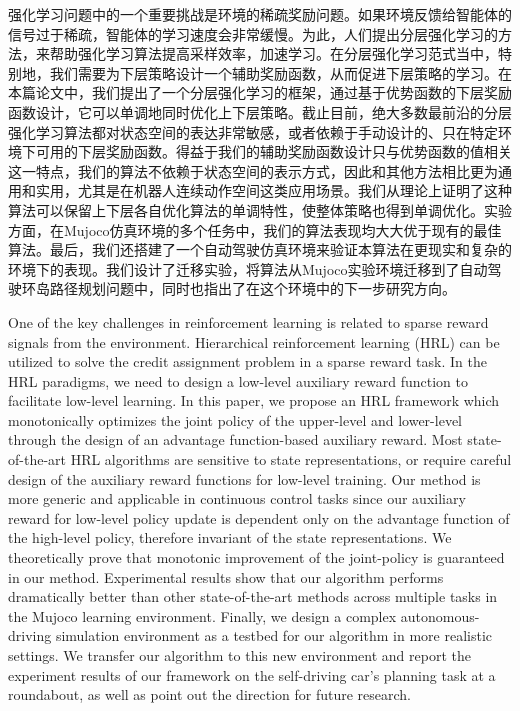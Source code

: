 \begin{cabstract}
强化学习问题中的一个重要挑战是环境的稀疏奖励问题。如果环境反馈给智能体的信号过于稀疏，智能体的学习速度会非常缓慢。为此，人们提出分层强化学习的方法，来帮助强化学习算法提高采样效率，加速学习。在分层强化学习范式当中，特别地，我们需要为下层策略设计一个辅助奖励函数，从而促进下层策略的学习。在本篇论文中，我们提出了一个分层强化学习的框架，通过基于优势函数的下层奖励函数设计，它可以单调地同时优化上下层策略。截止目前，绝大多数最前沿的分层强化学习算法都对状态空间的表达非常敏感，或者依赖于手动设计的、只在特定环境下可用的下层奖励函数。得益于我们的辅助奖励函数设计只与优势函数的值相关这一特点，我们的算法不依赖于状态空间的表示方式，因此和其他方法相比更为通用和实用，尤其是在机器人连续动作空间这类应用场景。我们从理论上证明了这种算法可以保留上下层各自优化算法的单调特性，使整体策略也得到单调优化。实验方面，在Mujoco仿真环境的多个任务中，我们的算法表现均大大优于现有的最佳算法。最后，我们还搭建了一个自动驾驶仿真环境来验证本算法在更现实和复杂的环境下的表现。我们设计了迁移实验，将算法从Mujoco实验环境迁移到了自动驾驶环岛路径规划问题中，同时也指出了在这个环境中的下一步研究方向。
\end{cabstract}

\begin{eabstract}
One of the key challenges in reinforcement learning is related to sparse reward signals from the environment. Hierarchical reinforcement learning (HRL) can be utilized to solve the credit assignment problem in a sparse reward task. In the HRL paradigms, we need to design a low-level auxiliary reward function to facilitate low-level learning. In this paper, we propose an HRL framework which monotonically  optimizes the joint policy of the upper-level and lower-level  through the design of an advantage function-based auxiliary reward. Most state-of-the-art HRL algorithms are sensitive to state representations, or require careful design of the auxiliary reward functions  for low-level training. Our method is more generic and applicable in continuous control tasks since our auxiliary reward for low-level policy update is dependent only on the advantage function of the high-level policy, therefore invariant of the state representations. We theoretically prove that monotonic improvement of the joint-policy is guaranteed in our method. Experimental results show that our algorithm performs dramatically better than other state-of-the-art methods across multiple tasks in the Mujoco learning environment. Finally, we design a complex autonomous-driving simulation environment as a testbed for our algorithm in more realistic settings. We transfer our algorithm to this new environment and report the experiment results of our framework on the self-driving car's planning task at a roundabout, as well as point out the direction for future research.

\end{eabstract}


